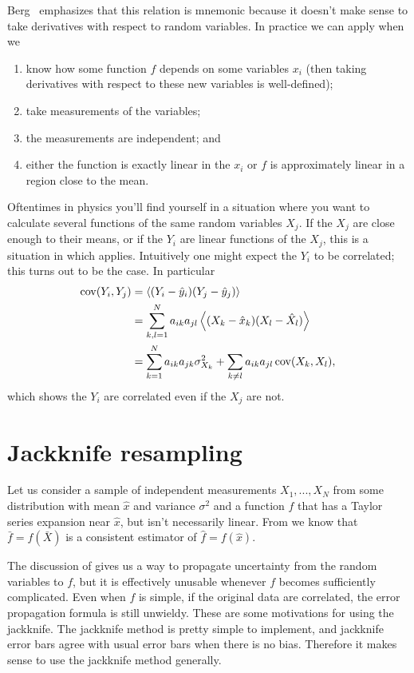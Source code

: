 Berg~\cite{berg_markov_2004} emphasizes that this relation is 
mnemonic because it doesn't make 
sense to take derivatives with respect to random variables. 
In practice we can apply  when we
\begin{enumerate}
  \item know how some function $f$ depends on some variables $x_i$
        (then taking derivatives with respect to these new variables
         is well-defined);
  \item take measurements of the variables;
  \item the measurements are independent; and
  \item either the function is exactly linear in the $x_i$ or $f$ is
        approximately linear in a region close to the mean.
\end{enumerate}

Oftentimes in physics you'll find yourself in a situation where you want
to calculate several functions of the same random variables $X_j$. If
the $X_j$ are close enough to their means, or if the $Y_i$ are linear
functions of the $X_j$, this is a situation in which  
applies. Intuitively one might expect the $Y_i$ to be correlated; this
turns out to be the case. In particular
\begin{equation}
  \begin{aligned}
    \Cov(Y_i,Y_j)&=\ev{(Y_i-\hat{y}_i)(Y_j-\hat{y}_j)}\\
                 &=\sum_{k,l=1}^N 
                  a_{ik}a_{jl}\ev{(X_k-\hat{x}_k)(X_l-\hat{X}_l)}\\
                 &=\sum_{k=1}^N a_{ik}a_{jk}\sigma^2_{X_k}
                   +\sum_{k\neq l} a_{ik}a_{jl}\Cov(X_k,X_l),
  \end{aligned}
\end{equation}
which shows the $Y_i$ are correlated even if the $X_j$ are not.

\section{Jackknife resampling}
Let us consider a sample of independent measurements 
$X_1,...,X_N$ from some distribution with mean $\hat{x}$ and 
variance $\sigma^2$ and a function $f$ that has a Taylor series 
expansion near $\hat{x}$, but isn't necessarily linear.
From  we know that $\bar{f}=f(\bar{X})$ is
a consistent estimator of $\hat{f}=f(\hat{x})$. 

The discussion of  gives us a way to propagate 
uncertainty from the random variables to $f$, but it is effectively 
unusable whenever $f$ becomes sufficiently complicated. 
Even when $f$ is simple, if the original data are correlated, the 
error propagation formula  is still 
unwieldy. These are some motivations for using the jackknife.
The jackknife method is pretty simple to implement, and jackknife error 
bars agree with usual error bars when there is no bias.
Therefore it makes sense to use the jackknife method generally. 


